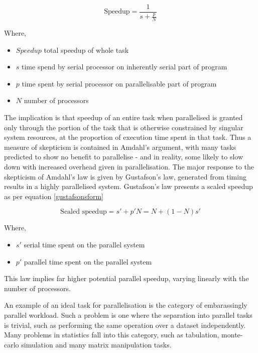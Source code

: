 \begin{equation}
        \label{amdahlsform}
        \textrm{Speedup} = \frac{1}{s+\frac{p}{N}}
\end{equation}

Where,

\begin{itemize}
        \item \(Speedup\) total speedup of whole task
        \item \(s\) time spend by serial processor on inherently serial part of program
        \item \(p\) time spent by serial processor on parallelisable part of program
        \item \(N\) number of processors
\end{itemize}

The implication is that speedup of an entire task when parallelised is granted only through the portion of the task that is otherwise constrained by singular system resources, at the proportion of execution time spent in that task.
Thus a measure of skepticism is contained in Amdahl's argument, with many tasks predicted to show no benefit to parallelise - and in reality, some likely to slow down with increased overhead given in parallelisation.
The major response to the skepticism of Amdahl's law is given by Gustafson's law, generated from timing results in a highly parallelised system.
Gustafson's law presents a scaled speedup as per equation \ref{gustafsonsform}

\begin{equation}
        \label{gustafsonsform}
        \textrm{Scaled speedup} = s' + p'N = N + (1-N)s'
\end{equation}

Where,

\begin{itemize}
        \item \(s'\) serial time spent on the parallel system
        \item \(p'\) parallel time spent on the parallel system
\end{itemize}

This law implies far higher potential parallel speedup, varying linearly with the number of processors.

An example of an ideal task for parallelisation is the category of embarassingly parallel workload.
Such a problem is one where the separation into parallel tasks is trivial, such as performing the same operation over a dataset independently\cite{foster1995parallel}.
Many problems in statistics fall into this category, such as tabulation, monte-carlo simulation and many matrix manipulation tasks.


